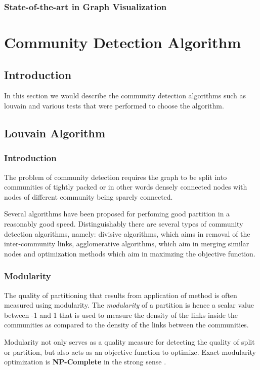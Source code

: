 \subsection{State-of-the-art in Graph Visualization}

\chapter{Community Detection Algorithm}
\section{Introduction}
In this section we would describe the community detection algorithms such as louvain and various tests that were performed to choose the algorithm. 
\section{Louvain Algorithm}
\subsection{Introduction}

The problem of community detection requires the graph to be split into communities of tightly packed or in other words densely connected nodes with nodes of different community being sparely connected. 

Several algorithms have been proposed for perfoming good partition in a reasonably good speed.
Distinguishably there are several types of community detection algorithms, namely: divisive algorithms, which aims in removal of the inter-community links, agglomerative algorithms, which aim in merging similar nodes and optimization methods which aim in maximzing the objective function. 
\subsection{Modularity}
The quality of partitioning that results from application of method is often measured using modularity. The \textit{modularity} of a partition is hence a scalar value between -1 and 1 that is used to measure the density of the links inside the communities as compared to the density of the links between the communities.
\par
Modularity not only serves as a quality measure for detecting the quality of split or partition, but also acts as an objective function to optimize.  Exact modularity optimization is \textbf{NP-Complete} in the strong sense \cite{modularityNP}.
